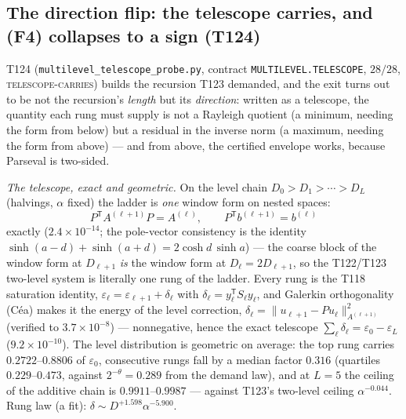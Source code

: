 \documentclass[11pt,a4paper]{article}
\begin{document}
\subsection{The direction flip: the telescope carries, and (F4) collapses to a sign (T124)}
T124 (\texttt{multilevel\_telescope\_probe.py}, contract \texttt{MULTILEVEL.TELESCOPE},
$28/28$, \textsc{telescope-carries}) builds the recursion T123 demanded, and the exit turns
out to be not the recursion's \emph{length} but its \emph{direction}: written as a telescope,
the quantity each rung must supply is not a Rayleigh quotient (a minimum, needing the form
from below) but a residual in the inverse norm (a maximum, needing the form from above) ---
and from above, the certified envelope works, because Parseval is two-sided.

\emph{The telescope, exact and geometric.} On the level chain $D_0>D_1>\cdots>D_L$
(halvings, $\alpha$ fixed) the ladder is \emph{one} window form on nested spaces:
\[
P^{\mathsf T}A^{(\ell+1)}P=A^{(\ell)},\qquad P^{\mathsf T}b^{(\ell+1)}=b^{(\ell)}
\]
exactly ($2.4\times10^{-14}$; the pole-vector consistency is the identity
$\sinh(a-d)+\sinh(a+d)=2\cosh d\,\sinh a$) --- the coarse block of the window form at
$D_{\ell+1}$ \emph{is} the window form at $D_\ell=2D_{\ell+1}$, so the T122/T123 two-level
system is literally one rung of the ladder. Every rung is the T118 saturation identity,
$\varepsilon_\ell=\varepsilon_{\ell+1}+\delta_\ell$ with
$\delta_\ell=y_\ell^{\mathsf T}S_\ell y_\ell$, and Galerkin orthogonality (C\'ea) makes it
the energy of the level correction,
$\delta_\ell=\|u_{\ell+1}-Pu_\ell\|^2_{A^{(\ell+1)}}$ (verified to $3.7\times10^{-8}$) ---
nonnegative, hence the exact telescope
$\sum_\ell\delta_\ell=\varepsilon_0-\varepsilon_L$ ($9.2\times10^{-10}$). The level
distribution is geometric on average: the top rung carries $0.2722$--$0.8806$ of
$\varepsilon_0$, consecutive rungs fall by a median factor $0.316$ (quartiles
$0.229$--$0.473$, against $2^{-\theta}=0.289$ from the demand law), and at $L=5$ the ceiling
of the additive chain is $0.9911$--$0.9987$ --- against T123's two-level ceiling
$\alpha^{-0.044}$. Rung law (a fit): $\delta\sim D^{+1.598}\alpha^{-5.900}$.
\end{document}
